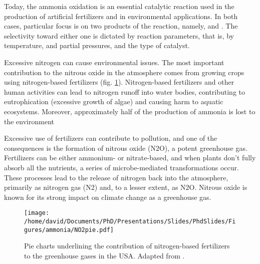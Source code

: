 Today, the ammonia oxidation is an essential catalytic reaction used in the production of artificial fertilizers and in environmental applications.
In both cases, particular focus is on two products of the reaction, namely, \nitricoxide and \nitrogen.
The selectivity toward either one is dictated by reaction parameters, that is, by temperature, \ammonia and \dioxygen partial pressures, and the type of catalyst.

Excessive nitrogen can cause environmental issues.
The most important contribution to the nitrous oxide in the atmosphere comes from growing crops using nitrogen-based fertilizers (fig. \ref{fig:PieGreenhouseNO2}).
Nitrogen-based fertilizers and other human activities can lead to nitrogen runoff into water bodies, contributing to eutrophication (excessive growth of algae) and causing harm to aquatic ecosystems.
Moreover, approximately half of the production of ammonia is lost to the environment \parencite{ERISMAN2007}

Excessive use of fertilizers can contribute to pollution, and one of the consequences is the formation of nitrous oxide (N2O), a potent greenhouse gas. Fertilizers can be either ammonium- or nitrate-based, and when plants don't fully absorb all the nutrients, a series of microbe-mediated transformations occur. These processes lead to the release of nitrogen back into the atmosphere, primarily as nitrogen gas (N2) and, to a lesser extent, as N2O. Nitrous oxide is known for its strong impact on climate change as a greenhouse gas.

\begin{figure}[!htb]
    \centering
    \texttt{[image: /home/david/Documents/PhD/Presentations/Slides/PhdSlides/Figures/ammonia/NO2pie.pdf]}
    \caption{Pie charts underlining the contribution of nitrogen-based fertilizers to the greenhouse gases in the USA.
    Adapted from \cite{EPAGreenhouseGases}.}
    \label{fig:PieGreenhouseNO2}
\end{figure}

